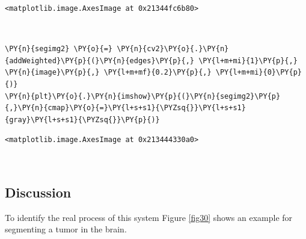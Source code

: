 \begin{tcolorbox}[breakable, size=fbox, boxrule=.5pt, pad at break*=1mm, opacityfill=0]
	\begin{Verbatim}[commandchars=\\\{\}]
<matplotlib.image.AxesImage at 0x21344fc6b80>
	\end{Verbatim}
\end{tcolorbox}

\begin{center}
\end{center}
{ \hspace*{\fill} \\}

\begin{tcolorbox}[breakable, size=fbox, boxrule=1pt, pad at break*=1mm,colback=cellbackground, colframe=cellborder]
	\begin{Verbatim}[commandchars=\\\{\}]
\PY{n}{segimg2} \PY{o}{=} \PY{n}{cv2}\PY{o}{.}\PY{n}{addWeighted}\PY{p}{(}\PY{n}{edges}\PY{p}{,} \PY{l+m+mi}{1}\PY{p}{,} \PY{n}{image}\PY{p}{,} \PY{l+m+mf}{0.2}\PY{p}{,} \PY{l+m+mi}{0}\PY{p}{)}
\PY{n}{plt}\PY{o}{.}\PY{n}{imshow}\PY{p}{(}\PY{n}{segimg2}\PY{p}{,}\PY{n}{cmap}\PY{o}{=}\PY{l+s+s1}{\PYZsq{}}\PY{l+s+s1}{gray}\PY{l+s+s1}{\PYZsq{}}\PY{p}{)}
	\end{Verbatim}
\end{tcolorbox}

\begin{tcolorbox}[breakable, size=fbox, boxrule=.5pt, pad at break*=1mm, opacityfill=0]
	\begin{Verbatim}[commandchars=\\\{\}]
<matplotlib.image.AxesImage at 0x213444330a0>
	\end{Verbatim}
\end{tcolorbox}

\begin{center}
\end{center}
{ \hspace*{\fill} \\}

\subsection{Discussion}
To identify the real process of this system Figure \ref{fig30} shows an example for segmenting a tumor in the brain. 

